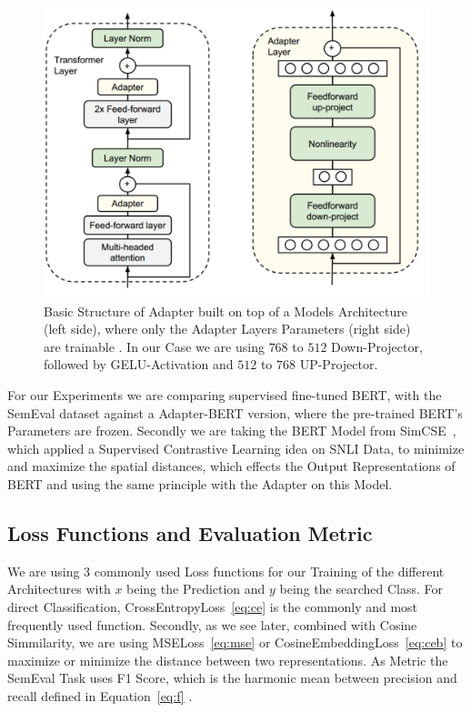 \begin{figure}[t]
    \centering
    \includegraphics[scale=0.2]{./content/Adapter_Architecture.png}
    \caption{Basic Structure of Adapter built on top of a Models Architecture (left side), where only the Adapter Layers Parameters (right side) are trainable \cite{zheng_learn_2023}.
             In our Case we are using $768$ to $512$ Down-Projector, followed by GELU-Activation and
             $512$ to $768$ UP-Projector.}
    \label{tab:adapt}
\end{figure}


For our Experiments we are comparing supervised fine-tuned BERT, with the SemEval dataset against
a Adapter-BERT version, where the pre-trained BERT's Parameters are frozen. Secondly we are
taking the BERT Model from SimCSE~\cite{gao_simcse_2022-1}, which applied a Supervised
Contrastive Learning idea on SNLI Data, to minimize and maximize the spatial distances,
which effects the Output Representations of BERT and using the same principle with the Adapter on this Model.







\subsection{Loss Functions and Evaluation Metric}
We are using 3 commonly used Loss functions for our Training of the different
Architectures with $x$ being the Prediction and $y$ being the searched Class. For direct Classification, 
CrossEntropyLoss~\ref{eq:ce} is the commonly and most frequently used function. Secondly, as we see later,
combined with Cosine Simmilarity, we are using MSELoss~\ref{eq:mse} or CosineEmbeddingLoss~\ref{eq:ceb}
to maximize or minimize the distance between two representations. As Metric the SemEval Task uses F1 Score, which
is the harmonic mean between precision and recall defined in Equation~\ref{eq:f} \cite{noauthor_nli4ct_nodate}.



